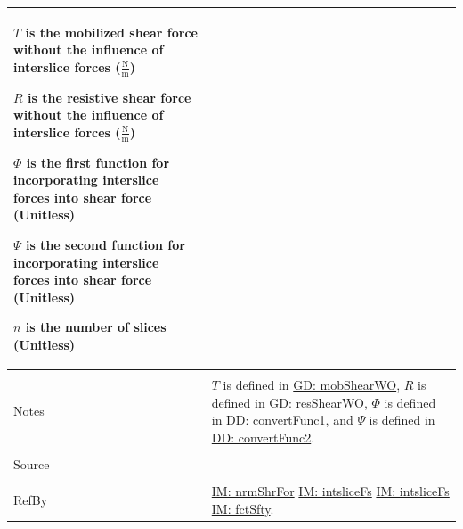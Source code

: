 \documentclass[12pt]{article}
\begin{document}
\begin{minipage}{\textwidth}
\begin{tabular}{p{} p{}}
\begin{symbDescription}
                                                                                           \item{$T$ is the mobilized shear force without the influence of interslice forces ($\frac{\text{N}}{\text{m}}$)}
                                                                                           \item{$R$ is the resistive shear force without the influence of interslice forces ($\frac{\text{N}}{\text{m}}$)}
                                                                                           \item{$Φ$ is the first function for incorporating interslice forces into shear force (Unitless)}
                                                                                           \item{$Ψ$ is the second function for incorporating interslice forces into shear force (Unitless)}
                                                                                           \item{$n$ is the number of slices (Unitless)}
                                                                                           \end{symbDescription}
                                                                                           \\ \midrule \\
                                                                                           Notes & $T$ is defined in \hyperref[GD:mobShearWO]{GD: mobShearWO}, $R$ is defined in \hyperref[GD:resShearWO]{GD: resShearWO}, $Φ$ is defined in \hyperref[DD:convertFunc1]{DD: convertFunc1}, and $Ψ$ is defined in \hyperref[DD:convertFunc2]{DD: convertFunc2}.
                                                                                                   \\ \midrule \\
                                                                                                   Source & \cite{chen2005}
                                                                                                            \\ \midrule \\
                                                                                                            RefBy & \hyperref[IM:nrmShrFor]{IM: nrmShrFor} \hyperref[IM:intsliceFs]{IM: intsliceFs} \hyperref[IM:intsliceFs]{IM: intsliceFs} \hyperref[IM:fctSfty]{IM: fctSfty}.
\\ \bottomrule \end{tabular}
\end{minipage}
\end{document}
